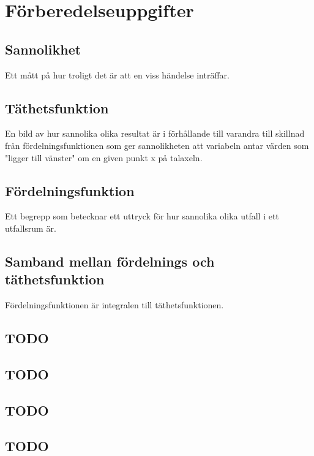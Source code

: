 \documentclass{article}
\begin{document}
\section*{Förberedelseuppgifter}

\addtocounter{section}{1}

\subsection{Sannolikhet}

Ett mått på hur troligt det är att en viss händelse inträffar.

\subsection{Täthetsfunktion}

En bild av hur sannolika olika resultat är i förhållande till varandra till
skillnad från fördelningsfunktionen som ger sannolikheten att variabeln antar
värden som "ligger till vänster" om en given punkt x på talaxeln.

\subsection{Fördelningsfunktion}

Ett begrepp som betecknar ett uttryck för hur sannolika olika utfall i ett
utfallsrum är.

\subsection{Samband mellan fördelnings och täthetsfunktion}

Fördelningsfunktionen är integralen till täthetsfunktionen.

\addtocounter{section}{1}

\subsection{TODO}
\subsection{TODO}
\subsection{TODO}
\subsection{TODO}
\end{document}
